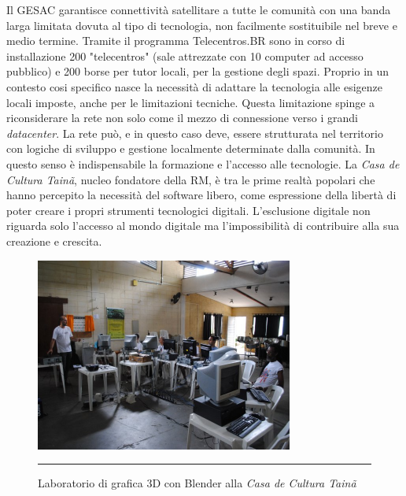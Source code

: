Il GESAC garantisce connettività satellitare a tutte
le comunità con una banda larga limitata dovuta al tipo di tecnologia,
non facilmente sostituibile nel breve e medio termine. Tramite il
programma Telecentros.BR sono in corso di installazione 200
"telecentros" (sale attrezzate con 10 computer ad accesso pubblico) e
200 borse per tutor locali, per la gestione degli spazi. Proprio in un
contesto cosi specifico nasce la necessità di adattare la tecnologia
alle esigenze locali imposte, anche per le limitazioni
tecniche. Questa limitazione spinge a riconsiderare la rete non solo
come il mezzo di connessione verso i grandi \emph{datacenter}. La rete
può, e in questo caso deve, essere strutturata nel territorio con
logiche di sviluppo e gestione localmente determinate dalla
comunità. In questo senso è indispensabile la formazione e l'accesso
alle tecnologie. La \emph{Casa de Cultura Tainã}, nucleo fondatore
della RM, è tra le prime realtà popolari che hanno percepito la
necessità del software libero, come espressione della libertà di poter
creare i propri strumenti tecnologici digitali. L'esclusione digitale
non riguarda solo l'accesso al mondo digitale ma l'impossibilità di
contribuire alla sua creazione e crescita.

\begin{figure}[htbp]
  \centering
  \includegraphics[width=\textwidth]{./Figure/taina_oficina.pdf}
  \rule{35em}{0.5pt}
  \caption[Laboratorio di grafica 3D con Blender alla \emph{Casa de
    Cultura Tainã}]{Laboratorio di grafica 3D con Blender alla
    \emph{Casa de Cultura Tainã}}
  \label{fig:oficinaBlender}
\end{figure}

